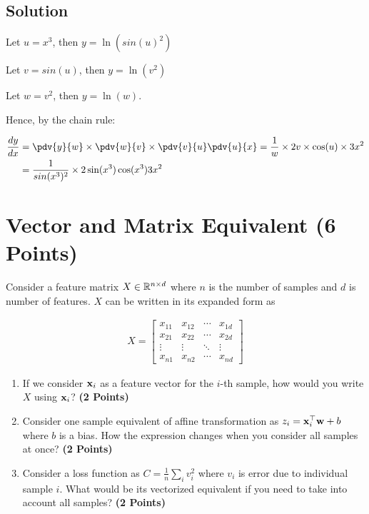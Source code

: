 \documentclass[12pt, xcolor=dvipsnames,svgnames,x11names]{article}
\begin{document}
\subsection{Solution}

Let $u = x^3$, then $ y = \ln( sin(u)^2 ) $

Let $v = sin(u)$, then $y = \ln(v^2)$

Let $w   = v^2$, then $y = \ln(w)$.

Hence, by the chain rule:

\begin{align*}
\frac{dy}{dx} & = \pdv{y}{w} \times \pdv{w}{v} \times \pdv{v}{u} \pdv{u}{x} = \frac{1}{w} \times 2v \times \cos(u) \times 3 x^2\\
& = \frac{1}{sin(x^3)^2} \times 2 \sin(x^3) \cos(x^3) 3x^2
\end{align*}




\section{Vector and Matrix Equivalent (6 Points)}
Consider a feature matrix $X \in {\mathbb R}^{n\times d}$ where $n$ is the number of samples and $d$ is number of features. $X$ can be written in its expanded form as 

\begin{align}
\label{eq:feature_matrix}
X =  \begin{bmatrix}
x_{11} & x_{12} & \cdots & x_{1d} \\
x_{21} & x_{22} & \cdots & x_{2d} \\
\vdots & \vdots & \ddots & \vdots \\
x_{n1} & x_{n2} & \cdots & x_{nd}
\end{bmatrix}
\end{align}

\begin{enumerate}

\item If we consider ${\mathbf x}_i$ as a feature vector for the $i$-th  sample, how would you write $X$ using ${\mathbf x}_i$? \hfill \textbf{(2 Points)}

\item Consider one sample equivalent of affine transformation as $ z_i = {\mathbf x}_i^\top {\mathbf w} + b$ where $b$ is a bias. How the expression changes when you consider all samples at once? \hfill \textbf{(2 Points)}

\item Consider a loss function as $C = \frac{1}{n}\sum_i v_i^2$ where $v_i$ is error due to individual sample $i$. What would be its vectorized equivalent if you need to take into account all samples? \hfill \textbf{(2 Points)}

\end{enumerate}
\end{document}
